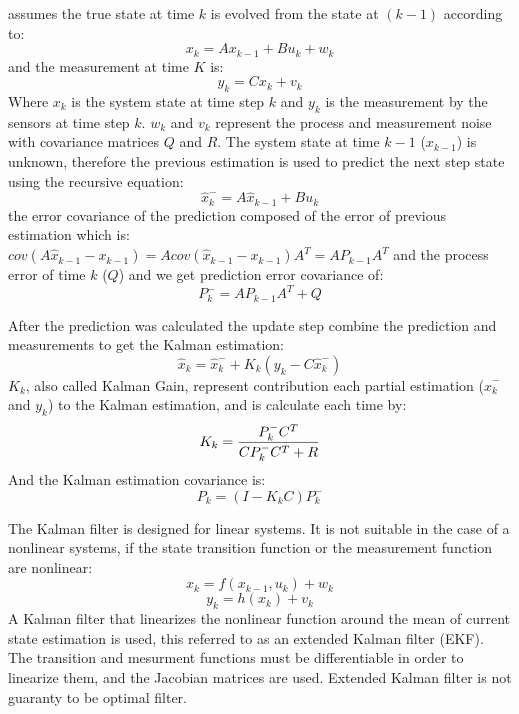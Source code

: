 \documentclass[ twoside, 12pt ]{article}
\newcommand{\commentOut}[1]{}
\begin{document}
assumes the true state at time $k$ is evolved from the state at $(k − 1)$ according to:
$$x_{k}=Ax_{k-1} + Bu_{k} + w_{k}$$
and the measurement at time $K$ is:
$$y_k=Cx_k+v_k$$
Where $x_k$ is the system state at time step $k$ and $y_k$ is the measurement by the sensors at time step $k$.
$w_k$ and $v_k$ represent the process and measurement noise with covariance matrices $Q$ and $R$.
The system state at time $k-1$ ($x_{k-1}$) is unknown, therefore the previous estimation is used to predict the next step state using the recursive equation:
$$ \hat{x}_{k}^-=A\hat{x}_{k-1} + Bu_{k} $$
the error covariance of the prediction composed of the error of previous estimation which is:
$cov(A\hat{x}_{k-1} - x_{k-1}) = A cov(\hat{x}_{k-1} - x_{k-1}) A^T=A P_{k-1} A^T$
and the process error of time $k$ ($Q$) and we get prediction error covariance of:
$$ P_k^- = A P_{k-1} A^T + Q $$

After the prediction was calculated the update step combine the prediction and measurements to get the Kalman estimation:
$$ \hat{x}_{k} = \hat{x}_{k}^- + K_k(y_k - C\hat{x}_{k}^-)$$
$K_k$, also called Kalman Gain, represent contribution each partial estimation ($\hat{x}_{k}^-$ and $y_k$) to the Kalman estimation, and is calculate each time by:
$$ K_k = {{P_k^- C^T} \over {C P_k^- C^T + R} }$$
And the Kalman estimation covariance is:
$$ P_k = (I - K_kC) P_k^- $$

The Kalman filter is designed for linear systems. It is not suitable in the case of a nonlinear systems, if the state transition function or the measurement function are nonlinear:
$$x_{k}=f(x_{k-1} , u_{k}) + w_{k}$$
$$y_k=h(x_k) + v_k$$
A Kalman filter that linearizes the nonlinear function around the mean of current state estimation is used, this referred to as an extended Kalman filter (EKF).
The transition and mesurment functions must be differentiable in order to linearize them, and the Jacobian matrices are used.
Extended Kalman filter is not guaranty to be optimal filter.



\commentOut{
In order to produce optimal estimation with Kalman filter, one of the parameter that we need to consider in our calculation is the variance of the sensor error.
But in our new framework the sensor (vision based sensor) have variable error variance for each time slot, this means that we need to have also variable state estimators correspondingly.
In order to adjust the sensor error variance, each time step the scheduler will inform the state estimator about the new error variance, and the state estimator will use corresponding parameters to make the next estimation.

APM, the control software that we will use, is already using kalman filter as the state estimator, so we only need to adjust the existing module to the variable sensor error variance, and to send the estimation error variance to the scheduler (see Section~\ref{sec:scheduler}).
}
\end{document}
